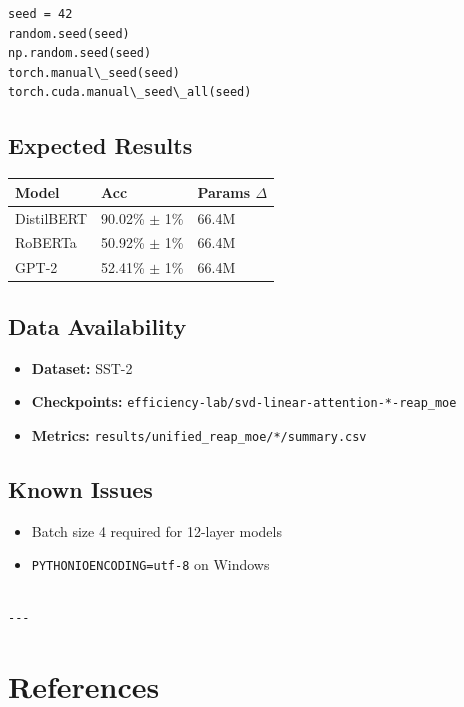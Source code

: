 \begin{lstlisting}
seed = 42
random.seed(seed)
np.random.seed(seed)
torch.manual\_seed(seed)
torch.cuda.manual\_seed\_all(seed)
\end{lstlisting}

\subsection{Expected Results}

\begin{table}[H]
\centering
\small
\begin{tabular}{lll}
\toprule
\textbf{Model} & \textbf{Acc} & \textbf{Params $\Delta$} \\
\midrule
DistilBERT & 90.02\% $\pm$ 1\% & 66.4M \\
RoBERTa & 50.92\% $\pm$ 1\% & 66.4M \\
GPT-2 & 52.41\% $\pm$ 1\% & 66.4M \\
\bottomrule
\end{tabular}
\end{table}

\subsection{Data Availability}

\begin{itemize}
\item \textbf{Dataset:} SST-2
\item \textbf{Checkpoints:} \texttt{efficiency-lab/svd-linear-attention-*-reap\_moe}
\item \textbf{Metrics:} \texttt{results/unified\_reap\_moe/*/summary.csv}

\end{itemize}
\subsection{Known Issues}

\begin{itemize}
\item Batch size 4 required for 12-layer models
\item \texttt{PYTHONIOENCODING=utf-8} on Windows
\end{itemize}
\begin{lstlisting}

---
\end{lstlisting}

\section{References}

